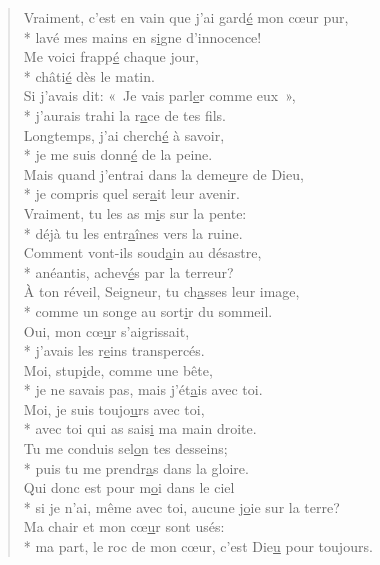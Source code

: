 \begin{verse}
Vraiment, c’est en vain que j’ai gard\underline{é} mon cœur pur, \\*
lavé mes mains en s\underline{i}gne d’innocence! \\
Me voici frapp\underline{é} chaque jour, \\*
châti\underline{é} dès le matin. \\

Si j’avais dit: « Je vais parl\underline{e}r comme eux », \\*
j’aurais trahi la r\underline{a}ce de tes fils. \\
Longtemps, j’ai cherch\underline{é} à savoir, \\*
je me suis donn\underline{é} de la peine. \\

Mais quand j’entrai dans la deme\underline{u}re de Dieu, \\*
je compris quel ser\underline{a}it leur avenir. \\
Vraiment, tu les as m\underline{i}s sur la pente: \\*
déjà tu les entr\underline{a}înes vers la ruine. \\

Comment vont-ils soud\underline{a}in au désastre, \\*
anéantis, achev\underline{é}s par la terreur? \\
À ton réveil, Seigneur, tu ch\underline{a}sses leur image, \\*
comme un songe au sort\underline{i}r du sommeil. \\

Oui, mon cœ\underline{u}r s’aigrissait, \\*
j’avais les r\underline{e}ins transpercés. \\
Moi, stup\underline{i}de, comme une bête, \\*
je ne savais pas, mais j’ét\underline{a}is avec toi. \\

Moi, je suis toujo\underline{u}rs avec toi, \\*
avec toi qui as sais\underline{i} ma main droite. \\
Tu me conduis sel\underline{o}n tes desseins; \\*
puis tu me prendr\underline{a}s dans la gloire. \\

Qui donc est pour m\underline{o}i dans le ciel \\*
si je n’ai, même avec toi, aucune j\underline{o}ie sur la terre? \\
Ma chair et mon cœ\underline{u}r sont usés: \\*
ma part, le roc de mon cœur, c’est Die\underline{u} pour toujours. \\


\end{verse}
